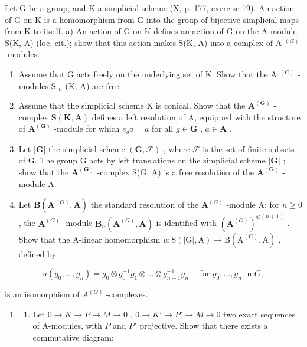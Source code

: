 Let G be a group, and K a simplicial scheme (X, p. 177, exercise 19). An action of G on K is a homomorphism from G into the group of bijective simplicial maps from K to itself. a) An action of G on K defines an action of G on the A-module S(K, A) (loc. cit.); show that this action makes S(K, A) into a complex of A \(^{(G)}\) -modules.

\begin{enumerate}
\def\labelenumi{\alph{enumi})}
\setcounter{enumi}{1}
\item
  Assume that G acts freely on the underlying set of K. Show that the A \(^{(G)}\) -modules S \(_{n}\) (K, A) are free.
\item
  Assume that the simplicial scheme K is conical. Show that the \(\mathbf{A}^{(\mathbf{G})}\) -complex \(\mathbf{S}(\mathbf{K},\mathbf{A})\) defines a left resolution of A, equipped with the structure of \(\mathbf{A}^{(\mathbf{G})}\) -module for which \(e_g a = a\) for all \(g \in \mathbf{G}\) , \(a \in \mathbf{A}\) .
\item
  Let \(|\mathbf{G}|\) the simplicial scheme \((\mathbf{G},\mathcal{F})\) , where \(\mathcal{F}\) is the set of finite subsets of G. The group G acts by left translations on the simplicial scheme \(|\mathbf{G}|\) ; show that the \(\mathbf{A}^{(\mathbf{G})}\) -complex S(\textbar G\textbar, A) is a free resolution of the \(\mathbf{A}^{(\mathbf{G})}\) -module A.
\item
  Let \(\mathbf{B}(\mathbf{A}^{(G)},\mathbf{A})\) the standard resolution of the \(\mathbf{A}^{(G)}\) -module A; for \(n\geqslant 0\) , the \(\mathbf{A}^{(G)}\) -module \(\mathbf{B}_n(\mathbf{A}^{(G)},\mathbf{A})\) is identified with \((\mathbf{A}^{(G)})^{\otimes (n + 1)}\) . Show that the A-linear homomorphism \(u:\mathrm{S}(|\mathrm{G}|,\mathrm{A})\to \mathrm{B}(\mathrm{A}^{(G)},\mathrm{A})\) , defined by
\end{enumerate}

\[
u \left(g _ {0}, \dots , g _ {n}\right) = g _ {0} \otimes g _ {0} ^ {- 1} g _ {1} \otimes \dots \otimes g _ {n - 1} ^ {- 1} g _ {n} \quad \text { for } g _ {0}, \dots , g _ {n} \text { in } G,
\]

is an isomorphism of \(A^{(G)}\) -complexes.

\begin{enumerate}
\def\labelenumi{\arabic{enumi})}
\setcounter{enumi}{4}
\tightlist
\item
  \begin{enumerate}
  \def\labelenumii{\alph{enumii})}
  \tightlist
  \item
    Let \(0 \to K \to P \to M \to 0\) , \(0 \to K' \to P' \to M \to 0\) two exact sequences of A-modules, with \(P\) and \(P'\) projective. Show that there exists a commutative diagram:
  \end{enumerate}
\end{enumerate}


